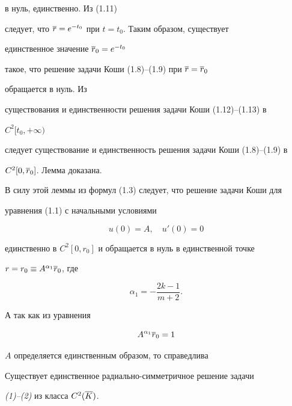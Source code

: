 \begin{pf}
в нуль, единственно. Из (1.11) 


следует, что $\overline r=e^{-t_0}$ при $t=t_0$. Таким образом, существует 


единственное значение $\overline r_0=e^{-t_0}$ 


такое, что решение задачи Коши (1.8)--(1.9) при $\overline r=\overline r_0$ 


обращается в нуль. Из 


существования и единственности решения задачи Коши (1.12)--(1.13) в 


$C^2[t_0,+\infty)$ 


следует существование и единственность решения задачи Коши (1.8)--(1.9) в 


$C^2[0,\overline r_0]$. Лемма доказана. 


\end{pf} 


 


В силу этой леммы из формул (1.3) следует, что решение задачи Коши для 


уравнения (1.1) с начальными условиями 


$$ 


u(0)=A,\quad u'(0)=0 


$$ 


единственно в $C^2[0,r_0]$ и обращается в нуль в единственной точке 


$r=r_0\equiv A^{\alpha_1}\overline r_0$, где 


$$ 


\alpha_1=-\frac{2k-1}{m+2}. 


$$ 


А так как из уравнения 


\begin{equation} 


A^{\alpha_1}\ovl r_0=1 


\end{equation} 


$A$ определяется единственным образом, то справедлива 


 


\begin{thm} Существует единственное радиально-симметричное решение задачи 


{\em (1)--(2)} из класса $C^2(\overline K)$. 


\end{thm} 


 


